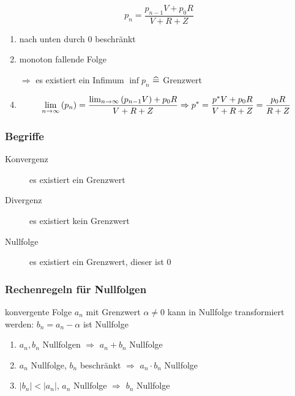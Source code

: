\begin{example}[Evakuierungspumpe]
  \[ p_n = \frac{p_{n-1}V+p_0R}{V+R+Z} \]
  \begin{enumerate}
    \item nach unten durch $0$ beschränkt
    \item monoton fallende Folge
    \item[$\Rightarrow$] es existiert ein Infimum $\inf p_n$ $\mathrel{\widehat{=}}$ Grenzwert
    \item
      \begin{equation*}
        \lim_{n \rightarrow \infty} \left( p_n \right) = \frac{\lim_{n \rightarrow \infty} \left( p_{n-1}V \right)+p_0R}{V+R+Z} \Rightarrow
        p^\ast = \frac{p^\ast V+p_0R}{V+R+Z} = \frac{p_0R}{R+Z}
      \end{equation*}
  \end{enumerate}
\end{example}

\subsubsection*{Begriffe}

\begin{description}
  \item[Konvergenz] es existiert ein Grenzwert
  \item[Divergenz] es existiert kein Grenzwert
  \item[Nullfolge] es existiert ein Grenzwert, dieser ist $0$
\end{description}

\subsubsection*{Rechenregeln für Nullfolgen}
\label{ssub:nullfolgen}

\begin{note}
  konvergente Folge $a_n$ mit Grenzwert $\alpha \neq 0$ kann in Nullfolge transformiert werden: $b_n = a_n - \alpha$ ist Nullfolge
\end{note}

\begin{enumerate}
  \item $a_n, b_n$ Nullfolgen $\Rightarrow$ $a_n+b_n$ Nullfolge
  \item $a_n$ Nullfolge, $b_n$ beschränkt $\Rightarrow$ $a_n\cdot b_n$ Nullfolge
  \item $\left|b_n\right| < \left|a_n\right|$, $a_n$ Nullfolge  $\Rightarrow$ $b_n$ Nullfolge
\end{enumerate}

